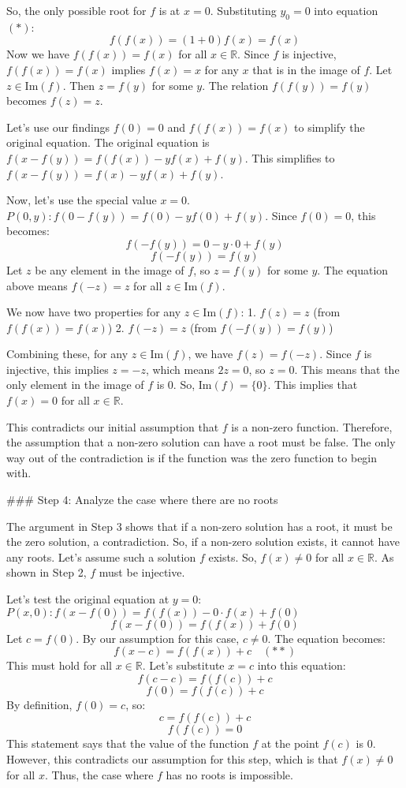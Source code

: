 So, the only possible root for $f$ is at $x=0$.
Substituting $y_0=0$ into equation $(*)$:
$$f(f(x)) = (1+0)f(x) = f(x)$$
Now we have $f(f(x))=f(x)$ for all $x \in \mathbb{R}$.
Since $f$ is injective, $f(f(x))=f(x)$ implies $f(x)=x$ for any $x$ that is in the image of $f$. Let $z \in \text{Im}(f)$. Then $z=f(y)$ for some $y$. The relation $f(f(y))=f(y)$ becomes $f(z)=z$.

Let's use our findings $f(0)=0$ and $f(f(x))=f(x)$ to simplify the original equation.
The original equation is $f(x-f(y)) = f(f(x)) - yf(x) + f(y)$.
This simplifies to $f(x-f(y)) = f(x) - yf(x) + f(y)$.

Now, let's use the special value $x=0$.
$P(0, y): f(0-f(y)) = f(0) - yf(0) + f(y)$.
Since $f(0)=0$, this becomes:
$$f(-f(y)) = 0 - y \cdot 0 + f(y)$$
$$f(-f(y)) = f(y)$$
Let $z$ be any element in the image of $f$, so $z=f(y)$ for some $y$. The equation above means $f(-z)=z$ for all $z \in \text{Im}(f)$.

We now have two properties for any $z \in \text{Im}(f)$:
1.  $f(z)=z$ (from $f(f(x))=f(x)$)
2.  $f(-z)=z$ (from $f(-f(y))=f(y)$)

Combining these, for any $z \in \text{Im}(f)$, we have $f(z) = f(-z)$.
Since $f$ is injective, this implies $z = -z$, which means $2z=0$, so $z=0$.
This means that the only element in the image of $f$ is 0. So, $\text{Im}(f) = \{0\}$.
This implies that $f(x)=0$ for all $x \in \mathbb{R}$.

This contradicts our initial assumption that $f$ is a non-zero function. Therefore, the assumption that a non-zero solution can have a root must be false. The only way out of the contradiction is if the function was the zero function to begin with.

### Step 4: Analyze the case where there are no roots

The argument in Step 3 shows that if a non-zero solution has a root, it must be the zero solution, a contradiction. So, if a non-zero solution exists, it cannot have any roots.
Let's assume such a solution $f$ exists. So, $f(x) \neq 0$ for all $x \in \mathbb{R}$.
As shown in Step 2, $f$ must be injective.

Let's test the original equation at $y=0$:
$P(x,0): f(x-f(0)) = f(f(x)) - 0 \cdot f(x) + f(0)$
$$f(x-f(0)) = f(f(x)) + f(0)$$
Let $c = f(0)$. By our assumption for this case, $c \neq 0$.
The equation becomes:
$$f(x-c) = f(f(x)) + c \quad (**)$$
This must hold for all $x \in \mathbb{R}$. Let's substitute $x=c$ into this equation:
$$f(c-c) = f(f(c)) + c$$
$$f(0) = f(f(c)) + c$$
By definition, $f(0)=c$, so:
$$c = f(f(c)) + c$$
$$f(f(c)) = 0$$
This statement says that the value of the function $f$ at the point $f(c)$ is 0.
However, this contradicts our assumption for this step, which is that $f(x) \neq 0$ for all $x$.
Thus, the case where $f$ has no roots is impossible.

